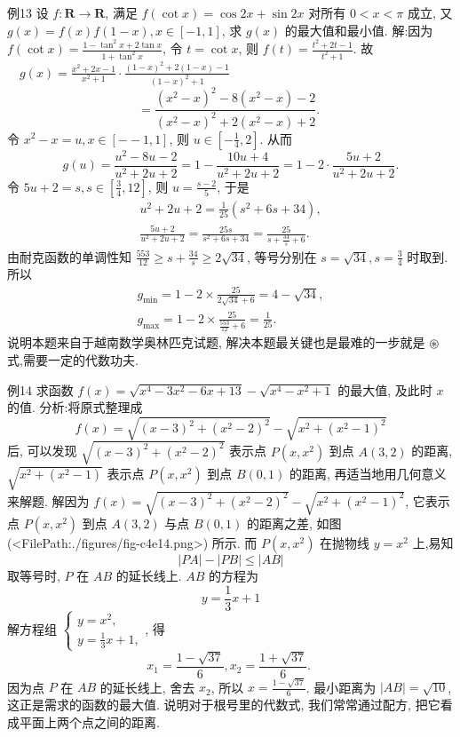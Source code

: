 例13 设 $f: \mathbf{R} \rightarrow \mathbf{R}$, 满足 $f(\cot x)=\cos 2 x+\sin 2 x$ 对所有 $0<x<\pi$ 成立, 又 $g(x)=f(x) f(1-x), x \in[-1,1]$, 求 $g(x)$ 的最大值和最小值.
解:因为 $f(\cot x)=\frac{1-\tan ^2 x+2 \tan x}{1+\tan ^2 x}$, 令 $t=\cot x$, 则 $f(t)= \frac{t^2+2 t-1}{t^2+1}$.
故 $\quad g(x)=\frac{x^2+2 x-1}{x^2+1} \cdot \frac{(1-x)^2+2(1-x)-1}{(1-x)^2+1}$
$$
=\frac{\left(x^2-x\right)^2-8\left(x^2-x\right)-2}{\left(x^2-x\right)^2+2\left(x^2-x\right)+2} \text {. }
$$
令 $x^2-x=u, x \in[--1,1]$, 则 $u \in\left[-\frac{1}{4}, 2\right]$. 从而
$$
g(u)=\frac{u^2-8 u-2}{u^2+2 u+2}=1-\frac{10 u+4}{u^2+2 u+2}=1-2 \cdot \frac{5 u+2}{u^2+2 u+2} .
$$
令 $5 u+2=s, s \in\left[\frac{3}{4}, 12\right]$, 则 $u=\frac{s-2}{5}$, 于是
$$
\begin{gathered}
u^2+2 u+2=\frac{1}{25}\left(s^2+6 s+34\right), \\
\frac{5 u+2}{u^2+2 u+2}=\frac{25 s}{s^2+6 s+34}=\frac{25}{s+\frac{34}{s}+6} .
\end{gathered}
$$
由耐克函数的单调性知 $\frac{553}{12} \geqslant s+\frac{34}{s} \geqslant 2 \sqrt{34}$, 等号分别在 $s=\sqrt{34}, s=\frac{3}{4}$ 时取到.
所以
$$
\begin{gathered}
g_{\min }=1-2 \times \frac{25}{2 \sqrt{34}+6}=4-\sqrt{34}, \\
g_{\max }=1-2 \times \frac{25}{\frac{553}{12}+6}=\frac{1}{25} .
\end{gathered}
$$
说明本题来自于越南数学奥林匹克试题, 解决本题最关键也是最难的一步就是 $\circledast$ 式,需要一定的代数功夫.



例14 求函数 $f(x)=\sqrt{x^4-3 x^2-6 x+13}-\sqrt{x^4-x^2+1}$ 的最大值, 及此时 $x$ 的值.
分析:将原式整理成
$$
f(x)=\sqrt{(x-3)^2+\left(x^2-2\right)^2}-\sqrt{x^2+\left(x^2-1\right)^2}
$$
后, 可以发现 $\sqrt{(x-3)^2+\left(x^2-2\right)^2}$ 表示点 $P\left(x, x^2\right)$ 到点 $A(3,2)$ 的距离, $\sqrt{x^2+\left(x^2-1\right)}$ 表示点 $P\left(x, x^2\right)$ 到点 $B(0,1)$ 的距离, 再适当地用几何意义来解题.
解因为 $f(x)=\sqrt{(x-3)^2+\left(x^2-2\right)^2}-\sqrt{x^2+\left(x^2-1\right)^2}$, 它表示点 $P\left(x, x^2\right)$ 到点 $A(3,2)$ 与点 $B(0,1)$ 的距离之差, 如图(<FilePath:./figures/fig-c4e14.png>) 所示.
而 $P\left(x, x^2\right)$ 在抛物线 $y=x^2$ 上,易知
$$
|P A|-|P B| \leqslant|A B|
$$
取等号时, $P$ 在 $A B$ 的延长线上.
$A B$ 的方程为
$$
y=\frac{1}{3} x+1
$$
解方程组 $\left\{\begin{array}{l}y=x^2, \\ y=\frac{1}{3} x+1,\end{array}\right.$, 得
$$
x_1=\frac{1-\sqrt{37}}{6}, x_2=\frac{1+\sqrt{37}}{6} \text {. }
$$
因为点 $P$ 在 $A B$ 的延长线上, 舍去 $x_2$, 所以 $x=\frac{1-\sqrt{37}}{6}$.
最小距离为 $|A B|=\sqrt{10}$, 这正是需求的函数的最大值.
说明对于根号里的代数式, 我们常常通过配方, 把它看成平面上两个点之间的距离.



